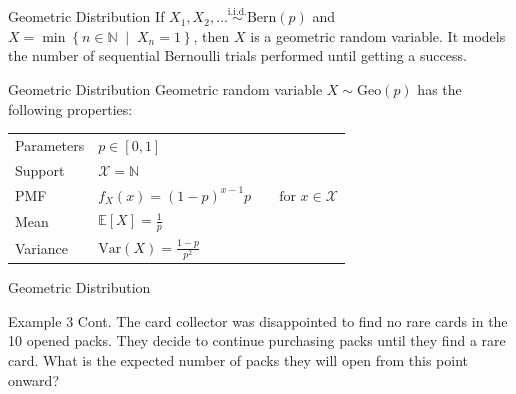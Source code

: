 \documentclass[10pt]{beamer}
\begin{document}
\begin{frame}[fragile]{Geometric Distribution}
If \(X_1, X_2, \dots \overset{\textrm{i.i.d.}}{\sim} \textrm{Bern}\left(p\right)\) and \(X = \min\left\{n \in \mathbb{N} \;\middle|\; X_n = 1\right\}\), then \(X\) is a geometric random variable. It models the number of sequential Bernoulli trials performed until getting a success.

\begin{alertblock}{Geometric Distribution}
Geometric random variable \(X \sim \textrm{Geo}\left(p\right)\) has the following properties:
  \begin{table}
    \begin{tabular}{ll}
      \toprule
      Parameters & \(p \in \left[0,1\right]\)\\
      Support & \(\mathcal{X} = \mathbb{N}\)\\
      PMF & \(f_X\left(x\right) = \left(1 - p\right)^{x - 1}p\qquad\textrm{for }x \in \mathcal{X}\)\\
      Mean & \(\mathbb{E}\left[X\right] = \frac{1}{p}\)\\
      Variance & \(\textrm{Var}\left(X\right) = \frac{1 - p}{p^2}\)\\
      \bottomrule
    \end{tabular}
  \end{table}
\end{alertblock}
\end{frame}

\begin{frame}[fragile]{Geometric Distribution}
\begin{exampleblock}{Example 3 Cont.}
The card collector was disappointed to find no rare cards in the 10 opened packs. They decide to continue purchasing packs until they find a rare card. What is the expected number of packs they will open from this point onward?
\end{exampleblock}
\end{frame}
\end{document}
